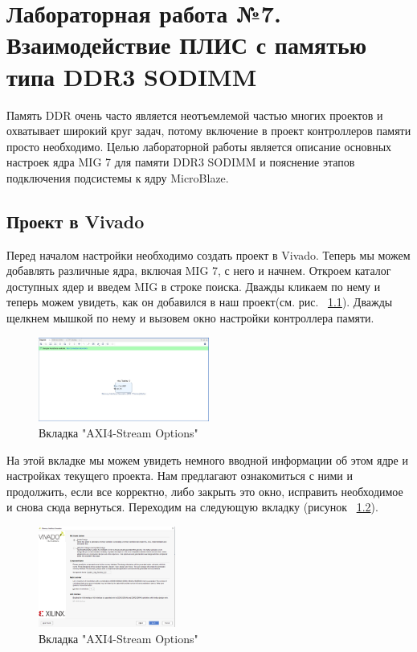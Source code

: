 \documentclass[a4paper,oneside ,14pt]{extreport}
\begin{document}
\chapter{Лабораторная работа №7. Взаимодействие ПЛИС с памятью типа DDR3 SODIMM}

Память DDR очень часто является неотъемлемой частью многих проектов и охватывает широкий круг задач, потому включение в проект контроллеров памяти просто необходимо.
Целью лабораторной работы является описание основных настроек ядра MIG 7 для памяти DDR3 SODIMM и пояснение этапов подключения подсистемы к ядру MicroBlaze.

\section{Проект в Vivado}

Перед началом настройки необходимо создать проект в Vivado. Теперь мы можем добавлять различные ядра, включая MIG 7, с него и начнем. Откроем каталог доступных ядер и введем MIG в строке поиска. Дважды кликаем по нему и теперь можем увидеть, как он добавился в наш проект(см. рис. ~\ref{mig_0_2}). Дважды щелкнем мышкой по нему и вызовем окно настройки контроллера памяти.

\begin{figure}[h]
	\centering
	\includegraphics[width=0.5\textwidth]{image/mig_0_2.png}
	\caption{Вкладка "AXI4-Stream Options"}
	\label{mig_0_2}
\end{figure}

На этой вкладке мы можем увидеть немного вводной информации об этом ядре и настройках текущего проекта. Нам предлагают ознакомиться с ними и продолжить, если все корректно, либо закрыть это окно, исправить необходимое и снова сюда вернуться. Переходим на следующую вкладку (рисунок ~\ref{mig_1}).

\begin{figure}[h]
	\centering
	\includegraphics[width=0.4\textwidth]{image/mig_1.png}
	\caption{Вкладка "AXI4-Stream Options"}
	\label{mig_1}
\end{figure}
\end{document}
